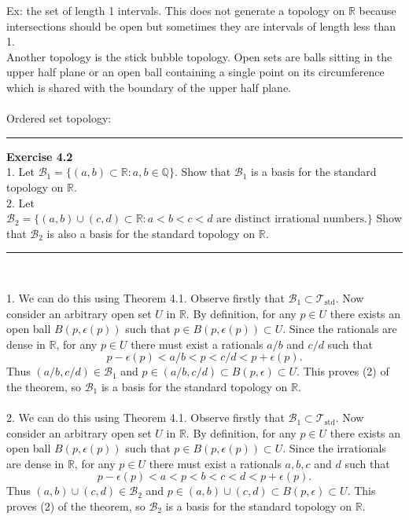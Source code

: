 \documentclass[a4paper,12pt,twoside]{hmcpset}
\begin{document}
Ex: the set of length 1 intervals. This does not generate a topology
on $\mathbb{R}$ because intersections should be open but sometimes
they are intervals of length less than 1. \\
Another topology is the stick bubble topology. Open sets are balls
sitting in the upper half plane or an open ball containing a single
point on its circumference which is shared with the boundary of the
upper half plane. \\
\\
Ordered set topology: \\ 
\newpage
\noindent\rule{18cm}{1pt}
\textbf{Exercise 4.2}\\
1. Let $\mathscr{B}_1 = \{(a,b) \subset \mathbb{R} : a, b \in
\mathbb{Q}\}$. Show that $\mathscr{B}_1$ is a basis for the standard
topology on $\mathbb{R}.$\\
2. Let $\mathscr{B}_2 = \{(a,b) \cup (c,d) \subset \mathbb{R} : a < b
< c < d \text{ are distinct irrational numbers.}\}$ Show that
$\mathscr{B}_2$ is also a basis for the standard topology on
$\mathbb{R}.$ 
\\\noindent\rule{18cm}{1pt}\\

\begin{solution}
    1. We can do this using Theorem 4.1. Observe firstly that $\mathscr{B}_1 \subset
\mathscr{T}_\text{std}$. Now consider an arbitrary open set $U$ in 
$\mathbb{R}$. By definition, for any $p \in U$ there exists an open
ball $B(p, \epsilon(p))$ such that $p \in B(p, \epsilon(p)) \subset
U$. 
Since
the rationals are dense in $\mathbb{R}$, for any $p \in U$ 
there must exist a rationals
$a/b$ and $c/d$ such that 
\[
    p - \epsilon(p) < a/b< p < c/d < p +
\epsilon(p).
\] 
Thus $(a/b, c/d) \in \mathscr{B}_1$ and 
$p \in (a/b, c/d) \subset B(p, \epsilon) \subset
U$. 
This
proves (2) of the theorem, so $\mathscr{B}_1$ is a
basis for the standard topology on $\mathbb{R}$. \\
\\
2. We can do this using Theorem 4.1. Observe firstly that $\mathscr{B}_1 \subset
\mathscr{T}_\text{std}$. Now consider an arbitrary open set $U$ in 
$\mathbb{R}$. By definition, for any $p \in U$ there exists an open
ball $B(p, \epsilon(p))$ such that $p \in B(p, \epsilon(p)) \subset
U$. 
Since
the irrationals are dense in $\mathbb{R}$, for any $p \in U$ 
there must exist a rationals
$a, b, c$ and $d$ such that 
\[
    p - \epsilon(p) < a< p < b < c < d < p +
\epsilon(p).
\]
Thus $(a, b) \cup (c, d) \in \mathscr{B}_2$ and 
$p \in (a, b) \cup (c, d) \subset B(p, \epsilon) \subset
U$. 
This
proves (2) of the theorem, so $\mathscr{B}_2$ is a
basis for the standard topology on $\mathbb{R}$.
\end{solution}
\end{document}
